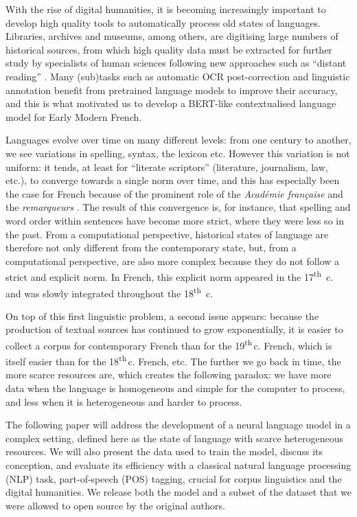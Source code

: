 With the rise of digital humanities, it is becoming increasingly important to develop high quality tools to automatically process old states of languages. Libraries, archives and museums, among others, are digitising large numbers of historical sources, from which high quality data must be extracted for further study by specialists of human sciences following new approaches such as ``distant reading'' \cite{moretti-2013-distant}. Many (sub)tasks such as automatic OCR post-correction \cite{rijhwani-etal-2021-lexically} and linguistic annotation \cite{camps-etal-2021-corpus} benefit from pretrained language models to improve their accuracy, and this is what motivated us to develop a BERT-like \cite{devlin-etal-2019-bert} contextualised language model for Early Modern French.

Languages evolve over time on many different levels: from one century to another, we see variations in spelling, syntax, the lexicon etc. However this variation is not uniform: it tends, at least for ``literate scriptors'' (literature, journalism, law, etc.), to converge towards a single norm over time, and this has especially been the case for French because of the prominent role of the \emph{Académie française} and the \emph{remarqueurs} \cite{ayres-bennett-etal-2011-remarques}. The result of this convergence is, for instance, that spelling and word order within sentences have become more strict, where they were less so in the past. From a computational perspective, historical states of language are therefore not only different from the contemporary state, but, from a computational perspective, are also more complex because they do not follow a strict and explicit norm. In French, this explicit norm  appeared in the 17\textsuperscript{th}~c. and was slowly integrated throughout the 18\textsuperscript{th}~c.

On top of this first linguistic problem, a second issue appears: because the production of textual sources has continued to grow exponentially, it is easier to collect a corpus for contemporary French  than for the 19\textsuperscript{th}\,c. French, which is itself easier than for the 18\textsuperscript{th}\,c. French, etc. The further we go back in time, the more scarce resources are, which creates the following paradox: we have more data when the language is homogeneous and simple for the computer to process, and less when it is heterogeneous and harder to process.

The following paper will address the development of \dalembert a neural language model in a complex setting, defined here as the state of language with scarce heterogeneous resources. We will also present \freemmax the data used to train the model, discuss its conception, and evaluate its efficiency with a classical natural language processing (NLP) task, part-of-speech (POS) tagging, crucial for corpus linguistics and the digital humanities. We release both the \dalembert model and a subset of the \freemmax dataset that we were allowed to open source by the original authors.
